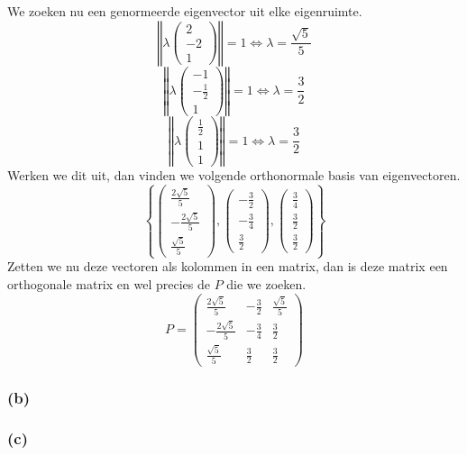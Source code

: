 \documentclass[lineaire_algebra_oplossingen.tex]{subfiles}
\begin{document}
We zoeken nu een genormeerde eigenvector uit elke eigenruimte.
\[
\left\Vert
\lambda
\begin{pmatrix}
2 \\ -2\\ 1
\end{pmatrix}
\right\Vert
=1
\Leftrightarrow
\lambda = \frac{\sqrt{5}}{5}
\]
\[
\left\Vert
\lambda
\begin{pmatrix}
-1 \\ -\frac{1}{2} \\ 1
\end{pmatrix}
\right\Vert
=1
\Leftrightarrow
\lambda = \frac{3}{2}
\]
\[
\left\Vert
\lambda
\begin{pmatrix}
\frac{1}{2} \\ 1 \\ 1
\end{pmatrix}
\right\Vert
=1
\Leftrightarrow
\lambda = \frac{3}{2}
\]
Werken we dit uit, dan vinden we volgende orthonormale basis van eigenvectoren.
\[
\left\{
\begin{pmatrix}
\frac{2\sqrt{5}}{5} \\ -\frac{2\sqrt{5}}{5}\\ \frac{\sqrt{5}}{5}
\end{pmatrix}
,
\begin{pmatrix}
-\frac{3}{2} \\ -\frac{3}{4} \\ \frac{3}{2}
\end{pmatrix}
,
\begin{pmatrix}
\frac{3}{4} \\ \frac{3}{2} \\ \frac{3}{2}
\end{pmatrix}
\right\}
\]
Zetten we nu deze vectoren als kolommen in een matrix, dan is deze matrix een orthogonale matrix en wel precies de $P$ die we zoeken.
\[
P=
\begin{pmatrix}
\frac{2\sqrt{5}}{5}  & -\frac{3}{2} & \frac{\sqrt{5}}{5}\\ 
-\frac{2\sqrt{5}}{5} & -\frac{3}{4} & \frac{3}{2}\\ 
\frac{\sqrt{5}}{5} & \frac{3}{2}    & \frac{3}{2}
\end{pmatrix}
\]


\subsubsection*{(b)}


\subsubsection*{(c)}
\end{document}
